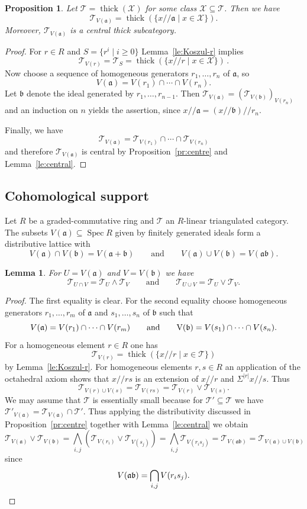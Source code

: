 \documentclass{amsart}[a4]
\newtheorem{lemma}[theorem]{Lemma}
\newtheorem{proposition}[theorem]{Proposition}
\theoremstyle{definition}
\theoremstyle{remark}
\numberwithin{equation}{section}
\newcommand{\Spec}{\operatorname{Spec}}
\newcommand{\thick}{\operatorname{thick}}
\newcommand{\kos}[2]{{#1}/\!\!/{#2}}
\newcommand{\cat}{\mathcal}
\newcommand{\fa}{\mathfrak{a}}
\newcommand{\fb}{\mathfrak{b}}
\newcommand{\Si}{\Sigma}
\let\Sigma\varSigma
\begin{document}
\begin{proposition}\label{pr:koszul}
  Let $\cat T=\thick(\cat X)$ for some class $\cat X\subseteq \cat T$.
  Then we have
  \[\cat T_{V(\fa)}=\thick(\{\kos x{\fa}\mid x\in\cat X\}).\]
  Moreover, $\cat T_{V(\fa)}$ is a central thick subcategory.
\end{proposition}
\begin{proof}
  For $r\in R$ and $S=\{r^i\mid i\ge 0\}$  Lemma~\ref{le:Koszul-r} implies
  \[\cat T_{V(r)}=\cat T_S=\thick(\{\kos xr\mid x\in\cat X\})\,.\]
  Now choose a sequence of homogeneous generators $r_1,\ldots,r_n$ of
  $\fa$, so
  \[V(\fa)=V(r_1)\cap\cdots\cap V(r_n).\] Let $\fb$ denote the ideal
  generated by $r_1,\ldots,r_{n-1}$. Then
  $\cat T_{V(\fa)}=(\cat T_{V(\fb)})_{V(r_n)}$ and an induction on $n$
  yields the assertion, since $\kos x{\fa}=\kos{(\kos x{\fb})}{r_n}$.

  Finally, we have
  \[\cat T_{V(\fa)}=\cat T_{V(r_1)}\cap\cdots\cap \cat T_{V(r_n)}\]
  and therefore $\cat T_{V(\fa)}$ is central by
  Proposition~\ref{pr:centre} and Lemma~\ref{le:central}.
\end{proof}


\subsection*{Cohomological support}

Let $R$ be a graded-commutative ring and $\cat T$ an $R$-linear
triangulated category.  The subsets $V(\fa)\subseteq\Spec R$ given by finitely generated
ideals form a distributive lattice with
\[V(\fa)\cap V(\fb)=V(\fa+\fb)\qquad\text{and}\qquad V(\fa)\cup V(\fb)=V(\fa\fb).\]

\begin{lemma}\label{le:union}
  For $U=V(\fa)$ and $V=V(\fb)$ we have
  \[\cat T_{U\cap V}=\cat T_U\wedge\cat T_V\qquad\text{and}\qquad
  \cat T_{U\cup V}=\cat T_U\vee\cat T_V.\]
\end{lemma}
\begin{proof}
  The first equality is clear. For the second equality choose
  homogeneous generators
  $r_1,\ldots,r_m$ of $\fa$ and  $s_1,\ldots,s_n$ of $\fb$ such that
  \[V(\fa)=V(r_1)\cap\cdots\cap V(r_m)\qquad\text{and}\qquad\text
    V(\fb)=V(s_1)\cap\cdots\cap V(s_n).\] For a homogeneous element
  $r\in R$ one has
  \[\cat T_{V(r)}=\thick(\{\kos{x}{r}\mid x\in\cat T\})\]
  by Lemma~\ref{le:Koszul-r}. For homogeneous elements $r,s\in R$ an
  application of the octahedral axiom shows that $\kos{x}{rs}$ is an
  extension of $\kos{x}{r}$ and $\kos{\Si^{|r|}x}{s}$. Thus
  \[\cat T_{V(r)\cup V(s)}=\cat T_{V(rs)}=\cat T_{V(r)}\vee\cat
    T_{V(s)}.\] We may assume that $\cat T$ is essentially small
  because for $\cat T'\subseteq\cat T$  we have $ \cat T'_{V(\fa)}=
  \cat T_{V(\fa)}\cap\cat T'$. Thus applying the distributivity discussed in
  Proposition~\ref{pr:centre} together with Lemma~\ref{le:central} we
  obtain
\[    \cat T_{V(\fa)}\vee\cat T_{V(\fb)}=\bigwedge_{i,j}( \cat T_{V(r_i)}\vee  \cat T_{V(s_j)})
=\bigwedge_{i,j} \cat T_{V(r_i s_j)}=\cat T_{V(\fa\fb)}=\cat T_{V(\fa)\cup
  V(\fb)}\]
since
\[V(\fa\fb)=\bigcap_{i,j} V(r_i s_j).\qedhere\]
\end{proof}
\end{document}
